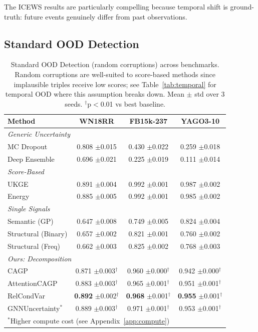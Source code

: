 The ICEWS results are particularly compelling because temporal shift is ground-truth: future events genuinely differ from past observations.

\subsection{Standard OOD Detection}

\begin{table}[t]
\centering
\caption{Standard OOD Detection (random corruptions) across benchmarks. Random corruptions are well-suited to score-based methods since implausible triples receive low scores; see Table~\ref{tab:temporal} for temporal OOD where this assumption breaks down. Mean $\pm$ std over 3 seeds. $^\dagger$p$<$0.01 vs best baseline.}
\label{tab:main}
\vspace{0.5em}
\small
\begin{tabular}{lccc}
\toprule
Method & WN18RR & FB15k-237 & YAGO3-10 \\
\midrule
\multicolumn{4}{l}{\textit{Generic Uncertainty}} \\
MC Dropout & 0.808 \tiny{$\pm$0.015} & 0.430 \tiny{$\pm$0.022} & 0.259 \tiny{$\pm$0.018} \\
Deep Ensemble & 0.696 \tiny{$\pm$0.021} & 0.225 \tiny{$\pm$0.019} & 0.111 \tiny{$\pm$0.014} \\
\midrule
\multicolumn{4}{l}{\textit{Score-Based}} \\
UKGE & 0.891 \tiny{$\pm$0.004} & 0.992 \tiny{$\pm$0.001} & 0.987 \tiny{$\pm$0.002} \\
Energy & 0.885 \tiny{$\pm$0.005} & 0.992 \tiny{$\pm$0.001} & 0.985 \tiny{$\pm$0.002} \\
\midrule
\multicolumn{4}{l}{\textit{Single Signals}} \\
Semantic (GP) & 0.647 \tiny{$\pm$0.008} & 0.749 \tiny{$\pm$0.005} & 0.824 \tiny{$\pm$0.004} \\
Structural (Binary) & 0.657 \tiny{$\pm$0.002} & 0.821 \tiny{$\pm$0.001} & 0.760 \tiny{$\pm$0.002} \\
Structural (Freq) & 0.662 \tiny{$\pm$0.003} & 0.825 \tiny{$\pm$0.002} & 0.768 \tiny{$\pm$0.003} \\
\midrule
\multicolumn{4}{l}{\textit{Ours: Decomposition}} \\
CAGP & 0.871 \tiny{$\pm$0.003}$^\dagger$ & 0.960 \tiny{$\pm$0.000}$^\dagger$ & 0.942 \tiny{$\pm$0.000}$^\dagger$ \\
AttentionCAGP & 0.883 \tiny{$\pm$0.003}$^\dagger$ & 0.965 \tiny{$\pm$0.001}$^\dagger$ & 0.951 \tiny{$\pm$0.001}$^\dagger$ \\
RelCondVar & \textbf{0.892} \tiny{$\pm$0.002}$^\dagger$ & \textbf{0.968} \tiny{$\pm$0.001}$^\dagger$ & \textbf{0.955} \tiny{$\pm$0.001}$^\dagger$ \\
GNNUncertainty$^*$ & 0.889 \tiny{$\pm$0.003}$^\dagger$ & 0.971 \tiny{$\pm$0.001}$^\dagger$ & 0.953 \tiny{$\pm$0.001}$^\dagger$ \\
\bottomrule
\multicolumn{4}{l}{\footnotesize $^*$Higher compute cost (see Appendix~\ref{app:compute})}
\end{tabular}
\end{table}

